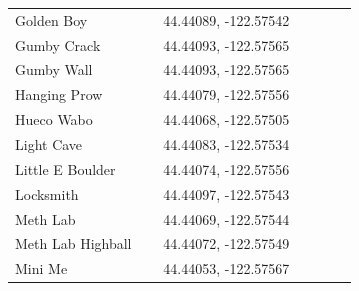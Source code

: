 \begin{flushleft}
\begin{center}
\begin{supertabular}{p{0.38\linewidth}p{0.5\linewidth}}
Golden Boy & 44.44089, -122.57542 \\
Gumby Crack & 44.44093, -122.57565 \\
Gumby Wall & 44.44093, -122.57565 \\
Hanging Prow & 44.44079, -122.57556 \\
Hueco Wabo & 44.44068, -122.57505 \\
Light Cave & 44.44083, -122.57534 \\
Little E Boulder & 44.44074, -122.57556 \\
Locksmith & 44.44097, -122.57543 \\
Meth Lab & 44.44069, -122.57544 \\
Meth Lab Highball & 44.44072, -122.57549 \\
Mini Me & 44.44053, -122.57567 \\

\end{supertabular}
\end{center}
\end{flushleft}
